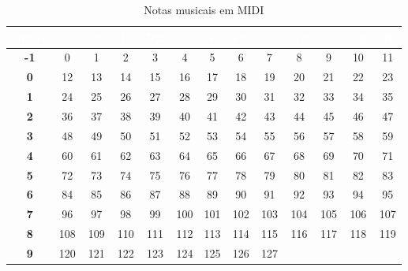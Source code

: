         \begin{table}[H]
            \centering
            \begin{tabular}{| c | c | c | c | c | c | c | c | c | c | c | c | c |}
                \hline
                \rowcolor{darkRed} \textcolor{white}{\textbf{Oitava}} & \textcolor{white}{\textbf{C}} & \textcolor{white}{\textbf{C\#}} & \textcolor{white}{\textbf{D}} & \textcolor{white}{\textbf{D\#}} & \textcolor{white}{\textbf{E}} & \textcolor{white}{\textbf{F}} & \textcolor{white}{\textbf{F\#}} & \textcolor{white}{\textbf{G}} & \textcolor{white}{\textbf{G\#}} & \textcolor{white}{\textbf{A}} & \textcolor{white}{\textbf{A\#}} & \textcolor{white}{\textbf{B}} \\
                \hline
                \rowcolor{lightRed} \textbf{-1} &  0   & 1   & 2   & 3   & 4   & 5   & 6   & 7   & 8   & 9   & 10 & 11 \\
                \hline
                \rowcolor{white}     \textbf{0} &  12  & 13  & 14  & 15  & 16  & 17  & 18  & 19  & 20  & 21  & 22 & 23 \\
                \hline
                \rowcolor{lightRed}  \textbf{1} &  24  & 25  & 26  & 27  & 28  & 29  & 30  & 31  & 32  & 33  & 34 & 35 \\
                \hline
                \rowcolor{white}     \textbf{2} &  36  & 37  & 38  & 39  & 40  & 41  & 42  & 43  & 44  & 45  & 46 & 47 \\
                \hline
                \rowcolor{lightRed}  \textbf{3} &  48  & 49  & 50  & 51  & 52  & 53  & 54  & 55  & 56  & 57  & 58 & 59 \\
                \hline
                \rowcolor{white}     \textbf{4} &  60  & 61  & 62  & 63  & 64  & 65  & 66  & 67  & 68  & 69  & 70 & 71 \\
                \hline
                \rowcolor{lightRed}  \textbf{5} &  72  & 73  & 74  & 75  & 76  & 77  & 78  & 79  & 80  & 81  & 82 & 83 \\
                \hline
                \rowcolor{white}     \textbf{6} &  84  & 85  & 86  & 87  & 88  & 89  & 90  & 91  & 92  & 93  & 94 & 95 \\
                \hline
                \rowcolor{lightRed}  \textbf{7} &  96  & 97  & 98  & 99  & 100 & 101 & 102 & 103 & 104 & 105 & 106 & 107 \\
                \hline
                \rowcolor{white}     \textbf{8} &  108 & 109 & 110 & 111 & 112 & 113 & 114 & 115 & 116 & 117 & 118 & 119 \\
                \hline
                \rowcolor{lightRed}  \textbf{9} &  120 & 121 & 122 & 123 & 124 & 125 & 126 & 127 &     &     &     &     \\
                \hline
            \end{tabular}
            \caption{Notas musicais em MIDI}
            \label{table:MIDI_notes}
        \end{table}

